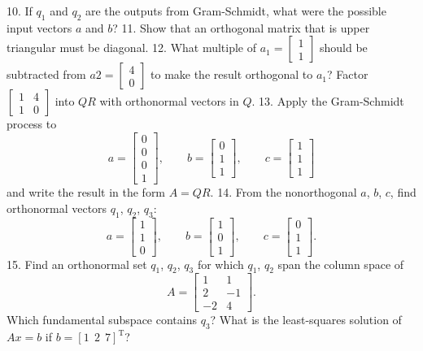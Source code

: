 10. If \(q_{1}\) and \(q_{2}\) are the outputs from Gram-Schmidt, what were the possible input vectors \(a\) and \(b\)?
11. Show that an orthogonal matrix that is upper triangular must be diagonal.
12. What multiple of \(a_{1}=\left[\begin{smallmatrix}1\\ 1\end{smallmatrix}\right]\) should be subtracted from \(a2=\left[\begin{smallmatrix}4\\ 0\end{smallmatrix}\right]\) to make the result orthogonal to \(a_{1}\)? Factor \(\left[\begin{smallmatrix}1&4\\ 1&0\end{smallmatrix}\right]\) into \(QR\) with orthonormal vectors in \(Q\).
13. Apply the Gram-Schmidt process to \[a=\begin{bmatrix}0\\ 0\\ 0\\ 1\end{bmatrix},\qquad b=\begin{bmatrix}0\\ 1\\ 1\end{bmatrix},\qquad c=\begin{bmatrix}1\\ 1\\ 1\end{bmatrix}\] and write the result in the form \(A=QR\).
14. From the nonorthogonal \(a\), \(b\), \(c\), find orthonormal vectors \(q_{1}\), \(q_{2}\), \(q_{3}\): \[a=\begin{bmatrix}1\\ 1\\ 0\end{bmatrix},\qquad b=\begin{bmatrix}1\\ 0\\ 1\end{bmatrix},\qquad c=\begin{bmatrix}0\\ 1\\ 1\end{bmatrix}.\]
15. Find an orthonormal set \(q_{1}\), \(q_{2}\), \(q_{3}\) for which \(q_{1}\), \(q_{2}\) span the column space of \[A=\begin{bmatrix}1&1\\ 2&-1\\ -2&4\end{bmatrix}.\] Which fundamental subspace contains \(q_{3}\)? What is the least-squares solution of \(Ax=b\) if \(b=[1\ \ 2\ \ 7]^{\mathrm{T}}\)?
